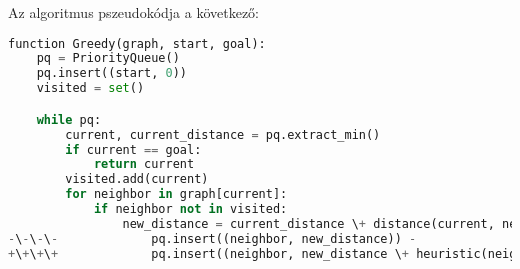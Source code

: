 Az algoritmus pszeudokódja a következő:

\begin{lstlisting}[language={Python}, style=gitdiff]
function Greedy(graph, start, goal):
    pq = PriorityQueue()
    pq.insert((start, 0))
    visited = set()

    while pq:
        current, current_distance = pq.extract_min()
        if current == goal:
            return current
        visited.add(current)
        for neighbor in graph[current]:
            if neighbor not in visited:
                new_distance = current_distance \+ distance(current, neighbor)
-\-\-\-             pq.insert((neighbor, new_distance)) -
+\+\+\+             pq.insert((neighbor, new_distance \+ heuristic(neighbor))) +
\end{lstlisting}
